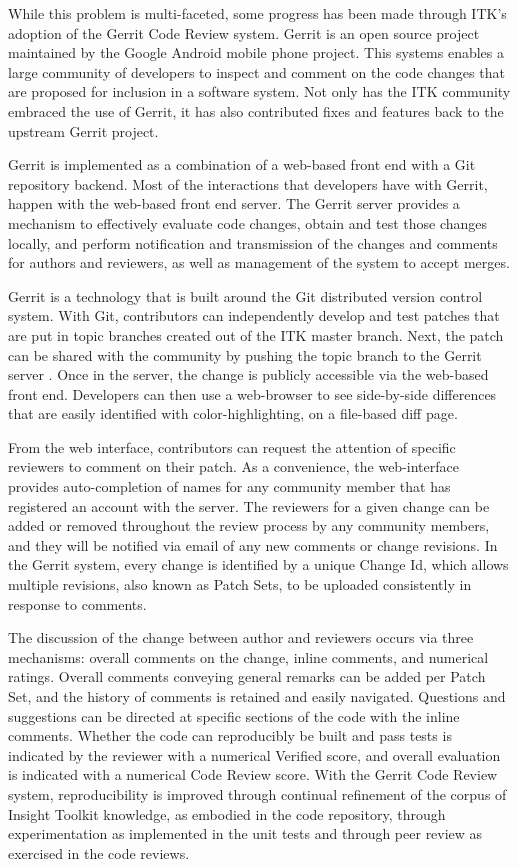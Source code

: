 \documentclass{frontiersENG} %
\begin{document}
While this problem is multi-faceted, some progress has been made through ITK’s
adoption of the Gerrit Code Review system.  Gerrit is an open source project
maintained by the Google Android mobile phone project. This systems enables a
large community of developers to inspect and comment on the code changes that
are proposed for inclusion in a software system. Not only has the ITK community
embraced the use of Gerrit, it has also contributed fixes and features back to
the upstream Gerrit project.

Gerrit is implemented as a combination of a web-based front end with a Git
repository backend. Most of the interactions that developers have with Gerrit,
happen with the web-based front end server. The Gerrit server provides a
mechanism to effectively evaluate code changes, obtain and test those changes
locally, and perform notification and transmission of the changes and comments
for authors and reviewers, as well as management of the system to accept
merges.

Gerrit is a technology that is built around the Git distributed version control
system.  With Git, contributors can independently develop and test patches that
are put in topic branches created out of the ITK master branch.  Next, the
patch can be shared with the community by pushing the topic branch to the
Gerrit server \cite{ITKGerrit}.  Once in the server, the change is publicly
accessible via the web-based front end.  Developers can then use a web-browser
to see side-by-side differences that are easily identified with
color-highlighting, on a file-based diff page.

From the web interface, contributors can request the attention of specific
reviewers to comment on their patch. As a convenience, the web-interface
provides auto-completion of names for any community member that has registered
an account with the server.  The reviewers for a given change can be added or
removed throughout the review process by any community members, and they will
be notified via email of any new comments or change revisions.  In the Gerrit
system, every change is identified by a unique Change Id, which allows multiple
revisions, also known as Patch Sets, to be uploaded consistently in response to
comments.

The discussion of the change between author and reviewers occurs via three
mechanisms: overall comments on the change, inline comments, and numerical
ratings. Overall comments conveying general remarks can be added per Patch
Set, and the history of comments is retained and easily navigated. Questions
and suggestions can be directed at specific sections of the code with the
inline comments. Whether the code can reproducibly be built and pass tests is
indicated by the reviewer with a numerical Verified score, and overall
evaluation is indicated with a numerical Code Review score. With the Gerrit
Code Review system, reproducibility is improved through continual refinement of
the corpus of Insight Toolkit knowledge, as embodied in the code repository,
through experimentation as implemented in the unit tests and through peer
review as exercised in the code reviews.
\end{document}

